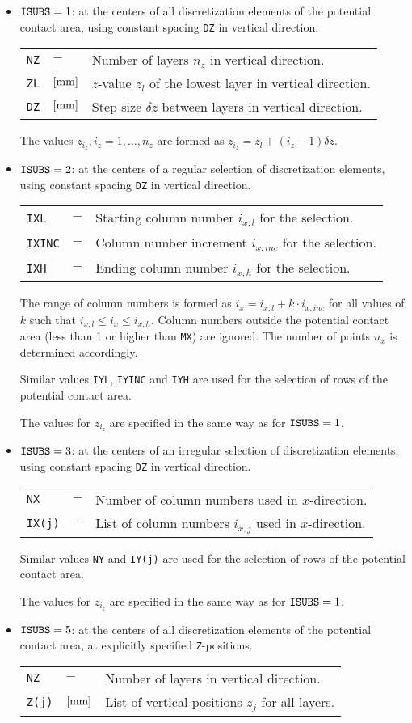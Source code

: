 \documentclass[12pt]{report}
\newcommand{\inpvar}[3]{{\small\tt #1} & $#2$ & #3 \\[1ex]}
\newenvironment{inputvarsml}{

\begin{tabular}{p{22mm}p{18mm}p{94mm}}\\[-1.5ex]}{
\end{tabular}

}
\begin{document}
\begin{itemize}
\item ${\tt ISUBS}=1$: at the centers of all discretization elements of the
potential contact area, using constant spacing {\tt DZ} in vertical
direction.
\begin{inputvarsml}
\inpvar{\tt NZ}{-}{Number of layers $n_z$ in vertical direction.}
\inpvar{\tt ZL}{\bunit{mm}}{$z$-value $z_l$ of the lowest layer in vertical direction.}
\inpvar{\tt DZ}{\bunit{mm}}{Step size $\delta z$ between layers in vertical direction.}
\end{inputvarsml}
The values $z_{i_z}, i_z=1,\ldots,n_z$ are formed as
$z_{i_z}=z_l+(i_z-1)\delta z$.

\item ${\tt ISUBS}=2$: at the centers of a regular selection of
discretization elements, using constant spacing {\tt DZ} in vertical
direction.
\begin{inputvarsml}
\inpvar{\tt IXL}{-}{Starting column number $i_{x,l}$ for the selection.}
\inpvar{\tt IXINC}{-}{Column number increment $i_{x,inc}$ for the selection.}
\inpvar{\tt IXH}{-}{Ending column number $i_{x,h}$ for the selection.}
\end{inputvarsml}
The range of column numbers is formed as $i_x = i_{x,l}+k\cdot i_{x,inc}$ for
all values of $k$ such that $i_{x,l}\le i_x \le i_{x,h}$. Column numbers
outside the potential contact area (less than 1 or higher than {\tt MX}) are
ignored.  The number of points $n_x$ is determined accordingly.

Similar values {\tt IYL}, {\tt IYINC} and {\tt IYH} are used for the
selection of rows of the potential contact area.

The values for $z_{i_z}$ are specified in the same way as for ${\tt 
ISUBS}=1$.

\item ${\tt ISUBS}=3$: at the centers of an irregular selection of
discretization elements, using constant spacing {\tt DZ} in vertical
direction.
\begin{inputvarsml}
\inpvar{\tt NX}{-}{Number of column numbers used in $x$-direction.}
\inpvar{\tt IX(j)}{-}{List of column numbers $i_{x,j}$ used in $x$-direction.}
\end{inputvarsml}
Similar values {\tt NY} and {\tt IY(j)} are used for the selection of rows
of the potential contact area.

The values for $z_{i_z}$ are specified in the same way as for ${\tt ISUBS}=1$.

\item ${\tt ISUBS}=5$: at the centers of all discretization elements of the
potential contact area, at explicitly specified {\tt Z}-positions.
\begin{inputvarsml}
\inpvar{\tt NZ}{-}{Number of layers in vertical direction.}
\inpvar{\tt Z(j)}{\bunit{mm}}{List of vertical positions $z_j$ for all layers.}
\end{inputvarsml}


\end{itemize}
\end{document}
